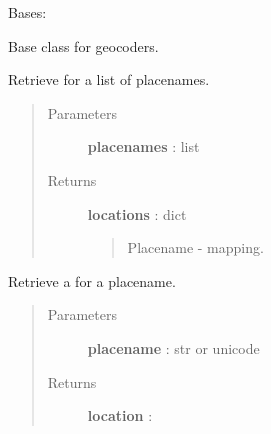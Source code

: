 \documentclass[letterpaper,10pt,english]{sphinxmanual}
\begin{document}
\begin{fulllineitems}
\label{tethne.services.geocode:tethne.services.geocode.BaseCoder}
Bases: 

Base class for geocoders.

\begin{fulllineitems}
\label{tethne.services.geocode:tethne.services.geocode.BaseCoder.code_list}
Retrieve {\hyperref[tethne.services.geocode:tethne.services.geocode.Location]{}} for a list of placenames.
\begin{quote}\begin{description}
\item[{Parameters}] \leavevmode
\textbf{placenames} : list

\item[{Returns}] \leavevmode
\textbf{locations} : dict
\begin{quote}

Placename - {\hyperref[tethne.services.geocode:tethne.services.geocode.Location]{}} mapping.
\end{quote}

\end{description}\end{quote}

\end{fulllineitems}


\begin{fulllineitems}
\label{tethne.services.geocode:tethne.services.geocode.BaseCoder.code_this}
Retrieve a {\hyperref[tethne.services.geocode:tethne.services.geocode.Location]{}} for a placename.
\begin{quote}\begin{description}
\item[{Parameters}] \leavevmode
\textbf{placename} : str or unicode

\item[{Returns}] \leavevmode
\textbf{location} : {\hyperref[tethne.services.geocode:tethne.services.geocode.Location]{}}

\end{description}\end{quote}


\end{fulllineitems}
\end{fulllineitems}
\end{document}
